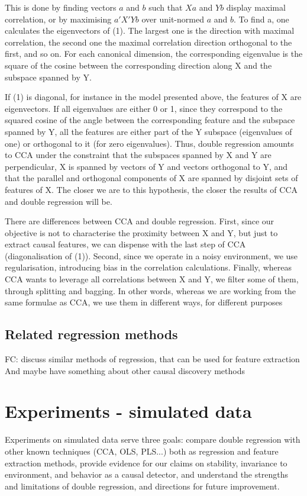 \documentclass{article}
\begin{document}
This is done by finding vectors $a$ and $b$ such that $Xa$ and $Yb$ display maximal correlation, or by maximising $a'X'Yb$ over unit-normed $a$ and $b$.
%
To find a, one calculates the eigenvectors of (1).
%
The largest one is the direction with maximal correlation, the second one the maximal correlation direction orthogonal to the first, and so on.
%
For each canonical dimension, the corresponding eigenvalue is the square of the cosine between the corresponding direction along X and the subspace spanned by Y.

If (1) is diagonal, for instance in the model presented above, the features of X are eigenvectors.
%
If all eigenvalues are either 0 or 1, since they correspond to the squared cosine of the angle between the corresponding feature and the subspace spanned by Y, all the features are either part of the Y subspace (eigenvalues of one) or orthogonal to it (for zero eigenvalues).
%
Thus, double regression amounts to CCA under the constraint that the subspaces spanned by X and Y are perpendicular, X is spanned by vectors of Y and vectors orthogonal to Y, and that the parallel and orthogonal components of X are spanned by disjoint sets of features of X.
%
The closer we are to this hypothesis, the closer the results of CCA and double regression will be.

There are differences between CCA and double regression.
%
First, since our objective is not to characterise the proximity between X and Y, but just to extract causal features, we can dispense with the last step of CCA (diagonalisation of (1)).
%
Second, since we operate in a noisy environment, we use regularisation, introducing bias in the correlation calculations.
%
Finally, whereas CCA wants to leverage all correlations between X and Y, we filter some of them, through splitting and bagging.
%
In other words, whereas we are working from the same formulae as CCA, we use them in different ways, for different purposes

\subsection{Related regression methods}
FC: discuss similar methods of regression, that can be used for feature extraction
And maybe have something about other causal discovery methods

\section{Experiments - simulated data}
Experiments on simulated data serve three goals: compare double regression with other known techniques (CCA, OLS, PLS...) both as regression and feature extraction methods, provide evidence for our claims on stability, invariance to environment, and behavior as a causal detector, and understand the strengths and limitations of double regression, and directions for future improvement.
\end{document}
